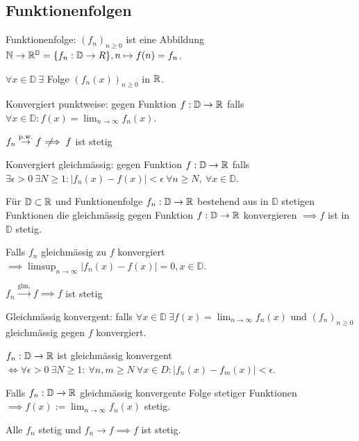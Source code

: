 \subsection{Funktionenfolgen}
\begin{compactdesc}
    \item[Funktionenfolge:] $\left( f_n \right)_{n \ge 0}$ ist eine Abbildung $\mathbb{N} \to \mathbb{R}^\mathbb{D} = \{f_n : \mathbb{D} \to R\}, n \mapsto f(n) = f_n$.
    \begin{compactitem}
        \item $\forall x \in \mathbb{D} \ \exists$ Folge $\left( f_n(x) \right)_{n \ge 0}$ in $\mathbb{R}$.
    \end{compactitem}
    \item[Konvergiert punktweise:] gegen Funktion $f: \mathbb{D} \to \mathbb{R}$ falls $\forall x \in \mathbb{D}: f(x) = \lim_{n \to \infty} f_n(x)$.
        \begin{compactitem}
            \item $f_n \overset{\text{p.w.}}{\to} f \;\not\!\!\!\implies f$ ist stetig
        \end{compactitem}
    \item[Konvergiert gleichmässig:] gegen Funktion $f: \mathbb{D} \to \mathbb{R}$ falls $\exists \epsilon > 0 \ \exists N \ge 1: \left| f_n(x) - f(x) \right| < \epsilon \ \forall n \ge N,\ \forall x \in \mathbb{D}$.
        \begin{compactitem}
            \item Für $\mathbb{D} \subset \mathbb{R}$ und Funktionenfolge $f_n:\mathbb{D} \to \mathbb{R}$ bestehend aus in $\mathbb{D}$ stetigen Funktionen die gleichmässig gegen Funktion $f: \mathbb{D} \to \mathbb{R}$ konvergieren $\implies f$ ist in $\mathbb{D}$ stetig.
            \item Falls $f_n$ gleichmässig zu $f$ konvergiert $\implies \limsup_{n \to \infty} \left| f_n(x) - f(x) \right| = 0, x \in \mathbb{D}$.
            \item $f_n \overset{\text{glm.}}{\to} f \implies f$ ist stetig
        \end{compactitem}
    \item[Gleichmässig konvergent:] falls $\forall x \in \mathbb{D} \ \exists f(x) = \lim_{n \to \infty} f_n(x)$ und $\left( f_n \right)_{n \ge 0}$ gleichmässig gegen $f$ konvergiert.
        \begin{compactitem}
            \item $f_n : \mathbb{D} \to \mathbb{R}$ ist gleichmässig konvergent $\iff \forall \epsilon > 0 \ \exists N \ge 1: \ \forall n,m \ge N \ \forall x \in D: \left| f_n(x) - f_m(x) \right| < \epsilon$.
            \item Falls $f_n:\mathbb{D} \to \mathbb{R}$ gleichmässig konvergente Folge stetiger Funktionen $\implies f(x) := \lim_{n \to \infty} f_n(x)$ stetig.
            \item Alle $f_n$ stetig und $f_n \to f \implies f$ ist stetig.
        \end{compactitem}
\end{compactdesc}

